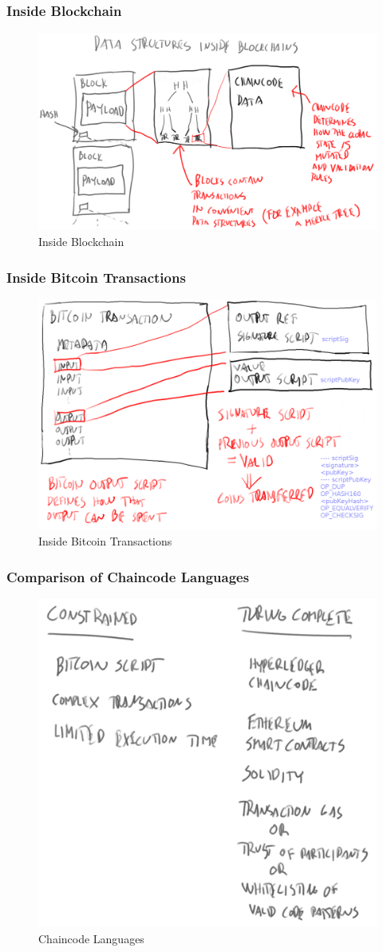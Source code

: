 \documentclass[8pt]{beamer}
\begin{document}
\begin{frame}
\frametitle{Inside Blockchain}

\begin{figure}[tb]
 \centering
 \includegraphics[width=8 cm,keepaspectratio=true]{./blockchain_images/inside_blockchains.png}
 \caption{Inside Blockchain}
\end{figure}

\end{frame}

\begin{frame}
\frametitle{Inside Bitcoin Transactions}

\begin{figure}[tb]
 \centering
 \includegraphics[width=10 cm,keepaspectratio=true]{./blockchain_images/bitcoin_transactions.png}
 \caption{Inside Bitcoin Transactions}
\end{figure}

\end{frame}

\begin{frame}
\frametitle{Comparison of Chaincode Languages}

\begin{figure}[tb]
 \centering
 \includegraphics[width=6 cm,keepaspectratio=true]{./blockchain_images/chaincodes.png}
 \caption{Chaincode Languages}
\end{figure}

\end{frame}
\end{document}
